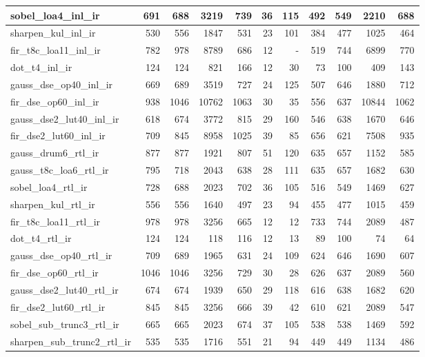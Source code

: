 \begin{table}[htbp]
\begin{tabular}{|l|r|r|r|r|r|r|r|r|r|r|}
sobel\_loa4\_inl\_ir & 691 & 688 & 3219 & 739 & 36 & 115 & 492 & 549 & 2210 & 688 \\ \hline
sharpen\_kul\_inl\_ir & 530 & 556 & 1847 & 531 & 23 & 101 & 384 & 477 & 1025 & 464 \\ \hline
fir\_t8c\_loa11\_inl\_ir & 782 & 978 & 8789 & 686 & 12 & - & 519 & 744 & 6899 & 770 \\ \hline
dot\_t4\_inl\_ir & 124 & 124 & 821 & 166 & 12 & 30 & 73 & 100 & 409 & 143 \\ \hline
gauss\_dse\_op40\_inl\_ir & 669 & 689 & 3519 & 727 & 24 & 125 & 507 & 646 & 1880 & 712 \\ \hline
fir\_dse\_op60\_inl\_ir & 938 & 1046 & 10762 & 1063 & 30 & 35 & 556 & 637 & 10844 & 1062 \\ \hline
gauss\_dse2\_lut40\_inl\_ir & 618 & 674 & 3772 & 815 & 29 & 160 & 546 & 638 & 1670 & 646 \\ \hline
fir\_dse2\_lut60\_inl\_ir & 709 & 845 & 8958 & 1025 & 39 & 85 & 656 & 621 & 7508 & 935 \\ \hline
gauss\_drum6\_rtl\_ir & 877 & 877 & 1921 & 807 & 51 & 120 & 635 & 657 & 1152 & 585 \\ \hline
gauss\_t8c\_loa6\_rtl\_ir & 795 & 718 & 2043 & 638 & 28 & 111 & 635 & 657 & 1682 & 630 \\ \hline
sobel\_loa4\_rtl\_ir & 728 & 688 & 2023 & 702 & 36 & 105 & 516 & 549 & 1469 & 627 \\ \hline
sharpen\_kul\_rtl\_ir & 556 & 556 & 1640 & 497 & 23 & 94 & 455 & 477 & 1015 & 459 \\ \hline
fir\_t8c\_loa11\_rtl\_ir & 978 & 978 & 3256 & 665 & 12 & 12 & 733 & 744 & 2089 & 487 \\ \hline
dot\_t4\_rtl\_ir & 124 & 124 & 118 & 116 & 12 & 13 & 89 & 100 & 74 & 64 \\ \hline
gauss\_dse\_op40\_rtl\_ir & 709 & 689 & 1965 & 631 & 24 & 109 & 624 & 646 & 1690 & 607 \\ \hline
fir\_dse\_op60\_rtl\_ir & 1046 & 1046 & 3256 & 729 & 30 & 28 & 626 & 637 & 2089 & 560 \\ \hline
gauss\_dse2\_lut40\_rtl\_ir & 674 & 674 & 1939 & 650 & 29 & 118 & 616 & 638 & 1682 & 620 \\ \hline
fir\_dse2\_lut60\_rtl\_ir & 845 & 845 & 3256 & 666 & 39 & 42 & 610 & 621 & 2089 & 547 \\ \hline
sobel\_sub\_trunc3\_rtl\_ir & 665 & 665 & 2023 & 674 & 37 & 105 & 538 & 538 & 1469 & 592 \\ \hline
sharpen\_sub\_trunc2\_rtl\_ir & 535 & 535 & 1716 & 551 & 21 & 94 & 449 & 449 & 1134 & 486 \\ \hline

\end{tabular}
\end{table}
